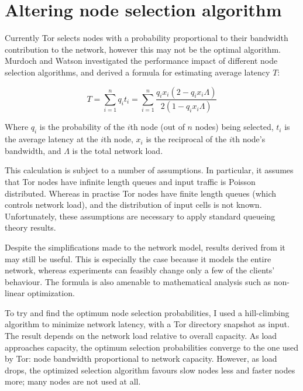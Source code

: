 \documentclass{article}
\title{\thetitle}
\author{Steven J. Murdoch}
\begin{document}
\thispagestyle{plain}
 
\maketitle

\section{Altering node selection algorithm}

Currently Tor selects nodes with a probability proportional to their bandwidth contribution to the network, however this may not be the optimal algorithm.
Murdoch and Watson investigated the performance impact of different node selection algorithms, and derived a formula for estimating average latency $T$:

\begin{equation}
T = \sum_{i=1}^n q_i t_i = \sum_{i=1}^n \frac{q_i x_i (2 - q_i x_i \Lambda)}{2 (1 - q_i x_i \Lambda)}
\label{eqn:waiting}
\end{equation}

Where $q_i$ is the probability of the $i$th node (out of $n$ nodes) being selected, $t_i$ is the average latency at the $i$th node, $x_i$ is the reciprocal of the $i$th node's bandwidth, and $\Lambda$ is the total network load.

This calculation is subject to a number of assumptions.
In particular, it assumes that Tor nodes have infinite length queues and input traffic is Poisson distributed.
Whereas in practise Tor nodes have finite length queues (which controls network load), and the distribution of input cells is not known.
Unfortunately, these assumptions are necessary to apply standard queueing theory results.

Despite the simplifications made to the network model, results derived from it may still be useful.
This is especially the case because it models the entire network, whereas experiments can feasibly change only a few of the clients' behaviour.
The formula is also amenable to mathematical analysis such as non-linear optimization.

To try and find the optimum node selection probabilities, I used a hill-climbing algorithm to minimize network latency, with a Tor directory snapshot as input.
The result depends on the network load relative to overall capacity.
As load approaches capacity, the optimum selection probabilities converge to the one used by Tor: node bandwidth proportional to network capacity.
However, as load drops, the optimized selection algorithm favours slow nodes less and faster nodes more; many nodes are not used at all.
\end{document}
